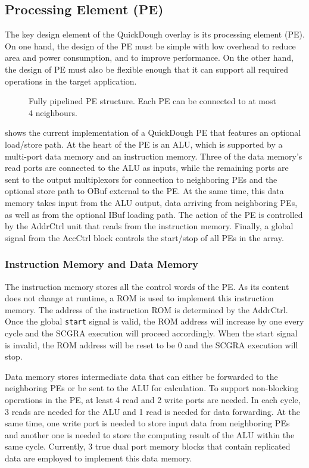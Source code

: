 \subsection{Processing Element (PE)}
The key design element of the QuickDough overlay is its processing element (PE).
On one hand, the design of the PE must be simple with low overhead to reduce area and power consumption, and to improve performance.
On the other hand, the design of PE must also be flexible enough that it can support all required operations in the target application.

\begin{figure}
\center{\texttt{[image: pe]}}
\caption{Fully pipelined PE structure. Each PE can be connected to at most 4 neighbours.}
\label{fig:pe}
\end{figure}

 shows the current implementation of a QuickDough PE that features an optional load/store path. 
At the heart of the PE is an ALU, which is supported by a multi-port data memory and an instruction memory.
Three of the data memory's read ports are connected to the ALU as inputs, while the remaining ports are sent to the output multiplexors for connection to neighboring PEs and the optional store path to OBuf external to the PE.
At the same time, this data memory takes input from the ALU output, data arriving from neighboring PEs, as well as from the optional IBuf loading path.
The action of the PE is controlled by the AddrCtrl unit that reads from the instruction memory.
Finally, a global signal from the AccCtrl block controls the start/stop of all PEs in the array.


\subsubsection{Instruction Memory and Data Memory}
The instruction memory stores all the control words of the PE.  As its content does not change at runtime, a ROM is used to implement this instruction memory. The address of the instruction ROM is determined by the AddrCtrl. Once the global
\texttt{start}
signal is valid, the ROM address will increase by one every cycle and the SCGRA execution will proceed accordingly. When the start signal is invalid, the ROM address will be reset to be 0 and the SCGRA execution will stop.

Data memory stores intermediate data that can either be forwarded to the neighboring PEs or be sent to the ALU for calculation.
To support non-blocking operations in the PE, at least 4 read and 2 write ports are needed.  In each cycle, 3 reads are needed for the ALU and 1 read is needed for data forwarding.  At the same time, one write port is needed to store input data from neighboring PEs and another one is needed to store the computing result of the ALU within the same cycle.
%
Currently, 3 true dual port memory blocks that contain replicated data are employed to implement this data memory.

